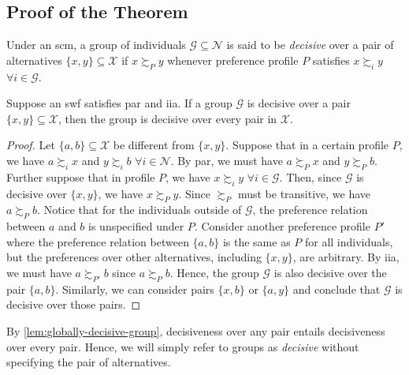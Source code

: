 \documentclass[a4paper]{article}
\begin{document}
\begin{multicols}{2}
\section{Proof of the Theorem}

\begin{definition}[Decisiveness]
	Under an \gls*{scm},
	a group of individuals $\mathcal{G}\subseteq\mathcal{N}$ is said to be
	\emph{decisive} over a pair of alternatives $\{x,y\}\subseteq\mathcal{X}$
	if $x\succsim_{P} y$ whenever preference profile $P$ satisfies $x\succsim_i y$ $\forall i\in\mathcal{G}$.
\end{definition}

\begin{lemma}\label{lem:globally-decisive-group}
	Suppose an \gls*{swf} satisfies \gls*{par} and \gls*{iia}.
	If a group $\mathcal{G}$ is decisive over a pair $\{x,y\}\subseteq\mathcal{X}$,
	then the group is decisive over every pair in $\mathcal{X}$.
\end{lemma}

\begin{proof}
	Let $\{a,b\}\subseteq\mathcal{X}$ be different from $\{x,y\}$.
	Suppose that in a certain profile $P$, we have $a\succsim_i x$ and $y\succsim_i b$ $\forall i\in\mathcal{N}$.
	By \gls*{par}, we must have $a \succsim_P x$ and $y\succsim_P b$.
	Further suppose that in profile $P$, we have $x\succsim_i y$ $\forall i\in\mathcal{G}$.
	Then, since $\mathcal{G}$ is decisive over $\{x,y\}$, we have $x\succsim_P y$.
	Since $\succsim_P$ must be transitive, we have $a\succsim_P b$.
	Notice that for the individuals outside of $\mathcal{G}$,
	the preference relation between $a$ and $b$ is unspecified under $P$.
	Consider another preference profile $P'$ where the preference relation between $\{a,b\}$
	is the same as $P$ for all individuals,
	but the preferences over other alternatives, including $\{x,y\}$, are arbitrary.
	By \gls*{iia}, we must have $a\succsim_{P'} b$ since $a\succsim_P b$.
	Hence, the group $\mathcal{G}$ is also decisive over the pair $\{a,b\}$.
	Similarly, we can consider pairs $\{x,b\}$ or $\{a,y\}$
	and conclude that $\mathcal{G}$ is decisive over those pairs.
\end{proof}

\begin{remark}
	By \autoref{lem:globally-decisive-group},
	decisiveness over any pair entails decisiveness over every pair.
	Hence, we will simply refer to groups as \emph{decisive} without specifying the pair of alternatives.
\end{remark}


\end{multicols}
\end{document}

